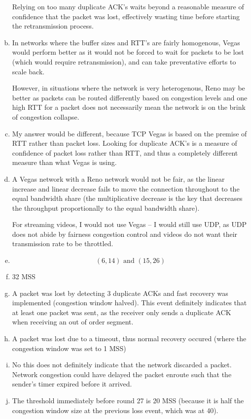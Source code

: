 \documentclass[11pt]{article}
\begin{document}
\begin{enumerate}[(a)]
      Relying on too many duplicate ACK's waits beyond a reasonable measure of
      confidence that the packet was lost, effectively wasting time before
      starting the retransmission process.
    \item
      In networks where the buffer sizes and RTT's are fairly homogenous, Vegas
      would perform better as it would not be forced to wait for packets to be
      lost (which would require retransmission), and can take preventative efforts
      to scale back.

      However, in situations where the network is very heterogenous, Reno may
      be better as packets can be routed differently based on congestion levels
      and one high RTT for a packet does not necessarily mean the network is
      on the brink of congestion collapse.
    \item
      My answer would be different, because TCP Vegas is based on the premise of
      RTT rather than packet loss. Looking for duplicate ACK's is a measure of
      confidence of packet loss rather than RTT, and thus a completely different
      measure than what Vegas is using.
    \item
      A Vegas network with a Reno network would not be fair, as the linear
      increase and linear decrease fails to move the connection throughout to
      the equal bandwidth share (the multiplicative decrease is the key that decreases
      the throughput proportionally to the equal bandwidth share).

      For streaming videos, I would not use Vegas -- I would still use UDP, as
      UDP does not abide by fairness congestion control and videos do not want
      their transmission rate to be throttled.
    \item
      \[ (6, 14) \text{ and } (15, 26) \]
    \item
      32 MSS
    \item
      A packet was lost by detecting 3 duplicate ACKs and fast recovery was implemented
      (congestion window halved). This event definitely indicates that at least one
      packet was sent, as the receiver only sends a duplicate ACK when receiving an
      out of order segment.
    \item
      A packet was lost due to a timeout, thus normal recovery occured (where the
      congestion window was set to 1 MSS)
    \item
      No this does not definitely indicate that the network discarded a packet.
      Network congestion could have delayed the packet enroute such that the
      sender's timer expired before it arrived.
    \item
      The threshold immediately before round 27 is 20 MSS (because it is half
      the congestion window size at the previous loss event, which was at 40).


\end{enumerate}
\end{document}
